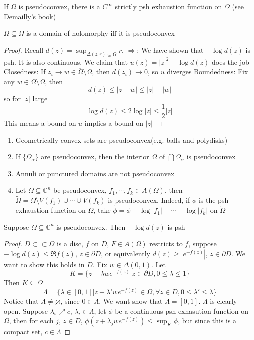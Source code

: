 \documentclass[../main.tex]{subfiles}
\begin{document}
\begin{fact}[Richberg]
If $\Omega$ is pseudoconvex, there is a $C^\infty$ strictly psh exhaustion function on $\Omega$ (see Demailly's book)
\end{fact}

\begin{theorem}
$\Omega\subseteq\Omega$ is a domain of holomorphy iff it is pseudoconvex
\end{theorem}

\begin{proof}
Recall $d(z)=\sup_{\Delta(z,r)\subseteq\Omega}r$. $\Rightarrow$: We have shown that $-\log d(z)$ is psh. It is also continuous. We claim that $u(z)=|z|^2-\log d(z)$ does the job
Closedness: If $z_i\to w\in\overline\Omega\setminus\Omega$, then $d(z_i)\to0$, so $u$ diverges
Boundedness: Fix any $w\in\overline\Omega\setminus\Omega$, then
\[d(z)\leq|z-w|\leq|z|+|w|\]
so for $|z|$ large
\[\log d(z)\leq 2\log|z|\leq\frac{1}{2}|z|\]
This means a bound on $u$ implies a bound on $|z|$
\end{proof}

\begin{example}
\begin{enumerate}
\item Geometrically convex sets are pseudoconvex(e.g. balls and polydisks)
\item If $\{\Omega_\alpha\}$ are pseudoconvex, then the interior $\Omega$ of $\bigcap\Omega_\alpha$ is pseudoconvex
\item Annuli or punctured domains are not pseudoconvex
\item Let $\Omega\subseteq\mathbb C^n$ be pseudoconvex, $f_1,\cdots,f_k\in A(\Omega)$, then $\tilde\Omega=\Omega\setminus V(f_1)\cup\cdots\cup V(f_k)$ is pseudoconvex. Indeed, if $\phi$ is the psh exhaustion function on $\Omega$, take $\tilde\phi=\phi-\log|f_1|-\cdots-\log|f_k|$ on $\tilde\Omega$
\end{enumerate}
\end{example}

\begin{proposition}
Suppose $\Omega\subseteq\mathbb C^n$ is pseudoconvex. Then $-\log d(z)$ is psh
\end{proposition}

\begin{proof}
$D\subset\subset\Omega$ is a disc, $f$ on $D$, $F\in A(\Omega)$ restricts to $f$, suppose $-\log d(z)\leq\Re f(z)$, $z\in\partial D$, or equivalently $d(z)\geq|e^{-f(z)}|$, $z\in\partial D$. We want to show this holds in $D$. Fix $w\in\Delta(0,1)$. Let
\[K=\{z+\lambda we^{-f(z)}|z\in\partial D,0\leq\lambda\leq1\}\]
Then $K\subseteq\Omega$
\[\Lambda=\{\lambda\in[0,1]|z+\lambda'we^{-f(z)}\in\Omega,\forall z\in D,0\leq\lambda'\leq\lambda\}\]
Notice that $\Lambda\neq\varnothing$, since $0\in\Lambda$. We want show that $\Lambda=[0,1]$. $\Lambda$ is clearly open. Suppose $\lambda_i\nearrow c$, $\lambda_i\in\Lambda$, let $\phi$ be a continuous psh exhasution function on $\Omega$, then for each $j$, $z\in D$, $\phi(z+\lambda_jwe^{-f(z)})\leq\sup_K\phi$, but since this is a compact set, $c\in\Lambda$
\end{proof}
\end{document}
